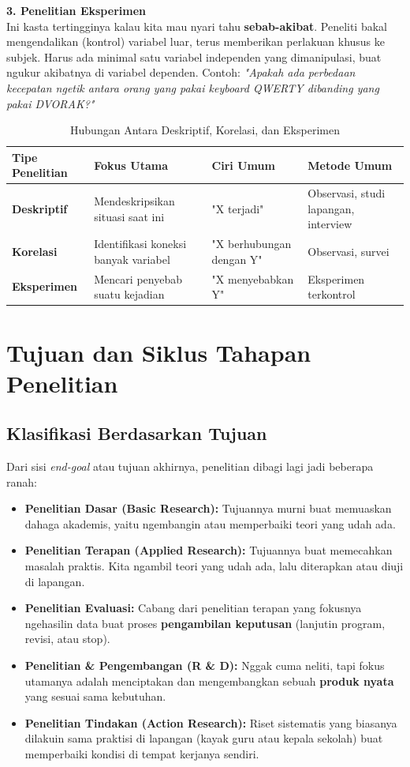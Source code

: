 \documentclass[12pt,a4paper]{article}
\begin{document}
\textbf{3. Penelitian Eksperimen} \\
Ini kasta tertingginya kalau kita mau nyari tahu \textbf{sebab-akibat}. Peneliti bakal mengendalikan (kontrol) variabel luar, terus memberikan perlakuan khusus ke subjek. Harus ada minimal satu variabel independen yang dimanipulasi, buat ngukur akibatnya di variabel dependen. Contoh: \textit{"Apakah ada perbedaan kecepatan ngetik antara orang yang pakai keyboard QWERTY dibanding yang pakai DVORAK?"}

\begin{table}[h]
\centering
\begin{tabular}{@{}p{3.5cm}p{4cm}p{3cm}p{4cm}@{}}
\toprule
\textbf{Tipe Penelitian} & \textbf{Fokus Utama} & \textbf{Ciri Umum} & \textbf{Metode Umum} \\ \midrule
\textbf{Deskriptif} & Mendeskripsikan situasi saat ini & "X terjadi" & Observasi, studi lapangan, interview \\ \addlinespace
\textbf{Korelasi} & Identifikasi koneksi banyak variabel & "X berhubungan dengan Y" & Observasi, survei \\ \addlinespace
\textbf{Eksperimen} & Mencari penyebab suatu kejadian & "X menyebabkan Y" & Eksperimen terkontrol \\ \bottomrule
\end{tabular}
\caption{Hubungan Antara Deskriptif, Korelasi, dan Eksperimen}
\end{table}

\newpage
\section{Tujuan dan Siklus Tahapan Penelitian}

\subsection{Klasifikasi Berdasarkan Tujuan}
Dari sisi \textit{end-goal} atau tujuan akhirnya, penelitian dibagi lagi jadi beberapa ranah:
\begin{itemize}
    \item \textbf{Penelitian Dasar (Basic Research):} Tujuannya murni buat memuaskan dahaga akademis, yaitu ngembangin atau memperbaiki teori yang udah ada.
    \item \textbf{Penelitian Terapan (Applied Research):} Tujuannya buat memecahkan masalah praktis. Kita ngambil teori yang udah ada, lalu diterapkan atau diuji di lapangan.
    \item \textbf{Penelitian Evaluasi:} Cabang dari penelitian terapan yang fokusnya ngehasilin data buat proses \textbf{pengambilan keputusan} (lanjutin program, revisi, atau stop).
    \item \textbf{Penelitian \& Pengembangan (R \& D):} Nggak cuma neliti, tapi fokus utamanya adalah menciptakan dan mengembangkan sebuah \textbf{produk nyata} yang sesuai sama kebutuhan.
    \item \textbf{Penelitian Tindakan (Action Research):} Riset sistematis yang biasanya dilakuin sama praktisi di lapangan (kayak guru atau kepala sekolah) buat memperbaiki kondisi di tempat kerjanya sendiri.
\end{itemize}
\end{document}
